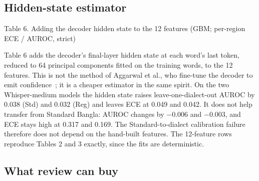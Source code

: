 \documentclass[10pt]{article}
\begin{document}
\subsection{Hidden-state estimator}

\begin{table}[htb]
\centering
\par\noindent\begin{minipage}{\linewidth}\small Table 6. Adding the decoder hidden state to the 12 features (GBM; per-region ECE / AUROC, strict)\end{minipage}\par\smallskip
\small
{}
\end{table}


Table 6 adds the decoder's final-layer hidden state at each word's last token, reduced to 64 principal components fitted on the training words, to the 12 features. This is not the method of Aggarwal et al., who fine-tune the decoder to emit confidence~\cite{Aggarwal2025}; it is a cheaper estimator in the same spirit. On the two Whisper-medium models the hidden state raises leave-one-dialect-out AUROC by 0.038 (Std) and 0.032 (Reg) and leaves ECE at 0.049 and 0.042. It does not help transfer from Standard Bangla: AUROC changes by $-$0.006 and $-$0.003, and ECE stays high at 0.317 and 0.169. The Standard-to-dialect calibration failure therefore does not depend on the hand-built features. The 12-feature rows reproduce Tables 2 and 3 exactly, since the fits are deterministic.


\subsection{What review can buy}
\end{document}

